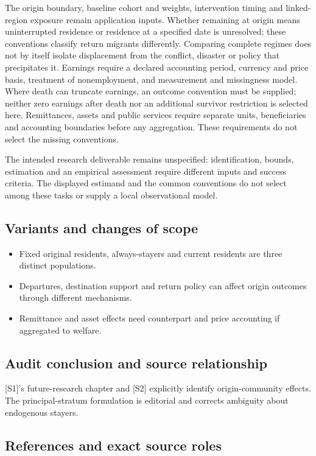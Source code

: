 \documentclass[11pt,a4paper]{article}
\begin{document}
The origin boundary, baseline cohort and weights, intervention timing and linked-region exposure remain application inputs. Whether remaining at origin means uninterrupted residence or residence at a specified date is unresolved; these conventions classify return migrants differently. Comparing complete regimes does not by itself isolate displacement from the conflict, disaster or policy that precipitates it. Earnings require a declared accounting period, currency and price basis, treatment of nonemployment, and measurement and missingness model. Where death can truncate earnings, an outcome convention must be supplied; neither zero earnings after death nor an additional survivor restriction is selected here. Remittances, assets and public services require separate units, beneficiaries and accounting boundaries before any aggregation. These requirements do not select the missing conventions.

The intended research deliverable remains unspecified: identification, bounds, estimation and an empirical assessment require different inputs and success criteria. The displayed estimand and the common conventions do not select among these tasks or supply a local observational model.

\subsection*{Variants and changes of scope}

\begin{itemize}
\item Fixed original residents, always-stayers and current residents are three distinct populations.
\item Departures, destination support and return policy can affect origin outcomes through different mechanisms.
\item Remittance and asset effects need counterpart and price accounting if aggregated to welfare.
\end{itemize}

\subsection*{Audit conclusion and source relationship}

[S1]'s future-research chapter and [S2] explicitly identify origin-community effects. The principal-stratum formulation is editorial and corrects ambiguity about endogenous stayers.

\subsection*{References and exact source roles}
\end{document}
